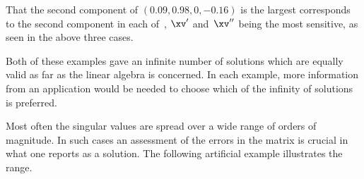 \begin{example}
\begin{enumerate}
\begin{solution}
That the second component of \((0.09,0.98,0,-0.16)\) is the largest corresponds to the second component in each of~\xv, \(\xv'\) and~\(\xv''\) being the most sensitive, as seen in the above three cases.
\end{solution}
\end{enumerate}

Both of these examples gave an infinite number of solutions which are equally valid as far as the linear algebra is concerned.
In each example, more information from an application would be needed to choose which of the infinity of solutions is preferred.
\end{example}


Most often the singular values are spread over a wide range of orders of magnitude.
In such cases an assessment of the errors in the matrix is crucial in what one reports as a solution.
The following artificial example illustrates the range.

